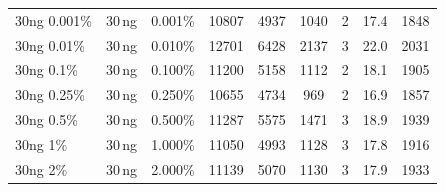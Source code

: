\begin{table}[h]
\begin{tabular}{llrccccrr}
    30ng 0.001\%& 30\,ng & 0.001\% & 10807 & 4937 & 1040 & 2 & 17.4 & 1848 \\
    30ng 0.01\% & 30\,ng & 0.010\% & 12701 & 6428 & 2137 & 3 & 22.0 & 2031 \\
    30ng 0.1\%  & 30\,ng & 0.100\% & 11200 & 5158 & 1112 & 2 & 18.1 & 1905 \\
    30ng 0.25\% & 30\,ng & 0.250\% & 10655 & 4734 &  969 & 2 & 16.9 & 1857 \\
    30ng 0.5\%  & 30\,ng & 0.500\% & 11287 & 5575 & 1471 & 3 & 18.9 & 1939 \\
    30ng 1\%    & 30\,ng & 1.000\% & 11050 & 4993 & 1128 & 3 & 17.8 & 1916 \\
    30ng 2\%    & 30\,ng & 2.000\% & 11139 & 5070 & 1130 & 3 & 17.9 & 1933 \\
    \bottomrule
  \end{tabular}
\end{table}
